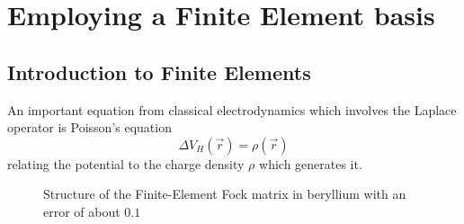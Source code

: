 \section{Employing a Finite Element basis}

\subsection{Introduction to Finite Elements}

An important equation from classical electrodynamics which
involves the Laplace operator is Poisson's equation
\begin{equation}
	\Delta V_H(\vec{r}) = \rho(\vec{r})
	\label{eqn:Poisson}
\end{equation}
relating the potential to the charge density $\rho$ which generates it.





\begin{figure}
	\centering
	\caption{Structure of the Finite-Element Fock matrix in beryllium
		with an error of about $0.1$}
	\label{fig:StructureFiniteElementFock}
\end{figure}

